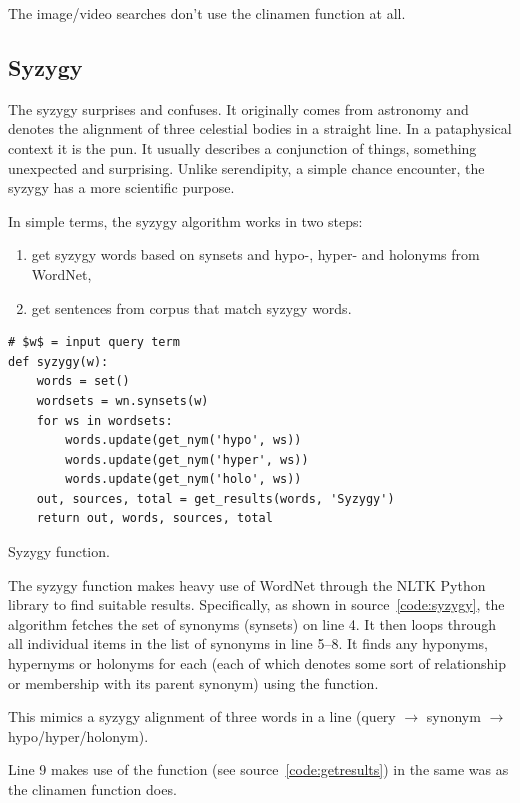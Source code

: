 The image/video searches don't use the clinamen function at all.


\subsection{Syzygy}

The syzygy surprises and confuses. It originally comes from astronomy and denotes the alignment of three celestial bodies in a straight line. In a pataphysical context it is the pun. It usually describes a conjunction of things, something unexpected and surprising. Unlike serendipity, a simple chance encounter, the syzygy has a more scientific purpose.

In simple terms, the syzygy algorithm works in two steps:
\begin{enumerate}
  \item get syzygy words based on synsets and hypo-, hyper- and holonyms from WordNet,
  \item get sentences from corpus that match syzygy words.
\end{enumerate}

\begin{listing}
  \begin{verbatim}
# $w$ = input query term
def syzygy(w):
    words = set()
    wordsets = wn.synsets(w)
    for ws in wordsets:
        words.update(get_nym('hypo', ws))
        words.update(get_nym('hyper', ws))
        words.update(get_nym('holo', ws))
    out, sources, total = get_results(words, 'Syzygy')
    return out, words, sources, total
  \end{verbatim}
\caption{Syzygy function.}
\label{code:syzygy}
\end{listing}

The syzygy function makes heavy use of WordNet \parencite{Miller1995} through the \ac{NLTK} Python library to find suitable results. Specifically, as shown in source~\ref{code:syzygy}, the algorithm fetches the set of synonyms (synsets) on line 4. It then loops through all individual items  in the list of synonyms  in line 5--8. It finds any hyponyms, hypernyms or holonyms for each  (each of which denotes some sort of relationship or membership with its parent synonym) using the  function.

This mimics a syzygy alignment of three words in a line (query $\to$ synonym $\to$ hypo/hyper/holonym).

Line 9 makes use of the  function (see source~\ref{code:getresults}) in the same was as the clinamen function does.

